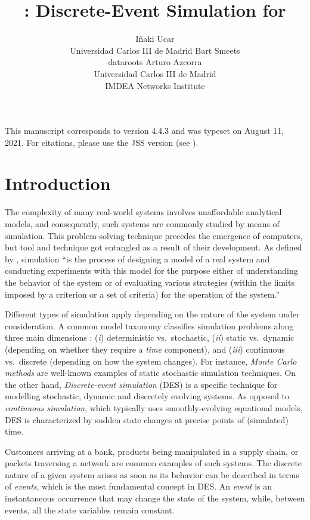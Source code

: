 \documentclass[
  nojss]{jss}
\author{
Iñaki Ucar\\Universidad Carlos III de Madrid \And Bart
Smeets\\dataroots \And Arturo Azcorra\\Universidad Carlos III de
Madrid\\
IMDEA Networks Institute
}
\title{\pkg{simmer}: Discrete-Event Simulation for \proglang{R}}
\begin{document}
\setlength{\abovedisplayskip}{0pt}

This manuscript corresponds to  version 4.4.3 and was
typeset on August 11, 2021. For citations, please use the JSS version
(see ).

\hypertarget{introduction}{%
\section{Introduction}\label{introduction}}

The complexity of many real-world systems involves unaffordable
analytical models, and consequently, such systems are commonly studied
by means of simulation. This problem-solving technique precedes the
emergence of computers, but tool and technique got entangled as a result
of their development. As defined by \citet{Shannon:1975:Systems},
simulation ``is the process of designing a model of a real system and
conducting experiments with this model for the purpose either of
understanding the behavior of the system or of evaluating various
strategies (within the limits imposed by a criterion or a set of
criteria) for the operation of the system.''

Different types of simulation apply depending on the nature of the
system under consideration. A common model taxonomy classifies
simulation problems along three main dimensions
\citep{Law:2000:Simulation}: (\emph{i}) deterministic vs.~stochastic,
(\emph{ii}) static vs.~dynamic (depending on whether they require a
\emph{time} component), and (\emph{iii}) continuous vs.~discrete
(depending on how the system changes). For instance, \emph{Monte Carlo
methods} are well-known examples of static stochastic simulation
techniques. On the other hand, \emph{Discrete-event simulation} (DES) is
a specific technique for modelling stochastic, dynamic and discretely
evolving systems. As opposed to \emph{continuous simulation}, which
typically uses smoothly-evolving equational models, DES is characterized
by sudden state changes at precise points of (simulated) time.

Customers arriving at a bank, products being manipulated in a supply
chain, or packets traversing a network are common examples of such
systems. The discrete nature of a given system arises as soon as its
behavior can be described in terms of \emph{events}, which is the most
fundamental concept in DES. An \emph{event} is an instantaneous
occurrence that may change the state of the system, while, between
events, all the state variables remain constant.
\end{document}

